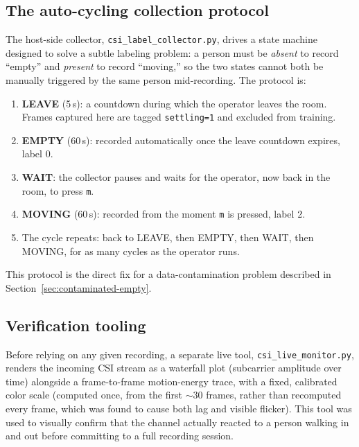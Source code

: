 \documentclass[11pt,a4paper]{article}
\begin{document}
\subsection{The auto-cycling collection protocol}
\label{sec:protocol}

The host-side collector, \texttt{csi\_label\_collector.py}, drives a
state machine designed to solve a subtle labeling problem: a person must
be \emph{absent} to record ``empty'' and \emph{present} to record
``moving,'' so the two states cannot both be manually triggered by the
same person mid-recording. The protocol is:

\begin{enumerate}
    \item \textbf{LEAVE} (5\,s): a countdown during which the operator
    leaves the room. Frames captured here are tagged
    \texttt{settling=1} and excluded from training.
    \item \textbf{EMPTY} (60\,s): recorded automatically once the leave
    countdown expires, label 0.
    \item \textbf{WAIT}: the collector pauses and waits for the operator,
    now back in the room, to press \texttt{m}.
    \item \textbf{MOVING} (60\,s): recorded from the moment \texttt{m} is
    pressed, label 2.
    \item The cycle repeats: back to LEAVE, then EMPTY, then WAIT, then
    MOVING, for as many cycles as the operator runs.
\end{enumerate}

This protocol is the direct fix for a data-contamination problem
described in Section~\ref{sec:contaminated-empty}.

\subsection{Verification tooling}

Before relying on any given recording, a separate live tool,
\texttt{csi\_live\_monitor.py}, renders the incoming CSI stream as a
waterfall plot (subcarrier amplitude over time) alongside a
frame-to-frame motion-energy trace, with a fixed, calibrated color scale
(computed once, from the first \(\sim\)30 frames, rather than
recomputed every frame, which was found to cause both lag and visible
flicker). This tool was used to visually confirm that the channel
actually reacted to a person walking in and out before committing to a
full recording session.
\end{document}

